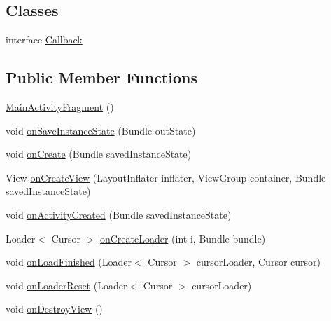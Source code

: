 \subsection*{Classes}
\begin{DoxyCompactItemize}
\item 
interface \hyperlink{interfaceorg_1_1buildmlearn_1_1dictation_1_1fragment_1_1MainActivityFragment_1_1Callback}{Callback}
\end{DoxyCompactItemize}
\subsection*{Public Member Functions}
\begin{DoxyCompactItemize}
\item 
\hyperlink{classorg_1_1buildmlearn_1_1dictation_1_1fragment_1_1MainActivityFragment_a63ceb64cf120683a0f4fa92cc9d1f709}{Main\+Activity\+Fragment} ()
\item 
void \hyperlink{classorg_1_1buildmlearn_1_1dictation_1_1fragment_1_1MainActivityFragment_af928359b96c8df2d535084087c664a16}{on\+Save\+Instance\+State} (Bundle out\+State)
\item 
void \hyperlink{classorg_1_1buildmlearn_1_1dictation_1_1fragment_1_1MainActivityFragment_ab5fcc0a30e26d51637458ee42dd31856}{on\+Create} (Bundle saved\+Instance\+State)
\item 
View \hyperlink{classorg_1_1buildmlearn_1_1dictation_1_1fragment_1_1MainActivityFragment_aaad4c9b624484fe217bf17a0690b1fbf}{on\+Create\+View} (Layout\+Inflater inflater, View\+Group container, Bundle saved\+Instance\+State)
\item 
void \hyperlink{classorg_1_1buildmlearn_1_1dictation_1_1fragment_1_1MainActivityFragment_ab0d7d7f231bda29e3f014ffb48165bcf}{on\+Activity\+Created} (Bundle saved\+Instance\+State)
\item 
Loader$<$ Cursor $>$ \hyperlink{classorg_1_1buildmlearn_1_1dictation_1_1fragment_1_1MainActivityFragment_a5601495a36de14b553f3b35230cd0850}{on\+Create\+Loader} (int i, Bundle bundle)
\item 
void \hyperlink{classorg_1_1buildmlearn_1_1dictation_1_1fragment_1_1MainActivityFragment_a649b6e347b7e71a7452ae2f91981fa81}{on\+Load\+Finished} (Loader$<$ Cursor $>$ cursor\+Loader, Cursor cursor)
\item 
void \hyperlink{classorg_1_1buildmlearn_1_1dictation_1_1fragment_1_1MainActivityFragment_a1e38cda6e1f613716c02bf4ca05ae38f}{on\+Loader\+Reset} (Loader$<$ Cursor $>$ cursor\+Loader)
\item 
void \hyperlink{classorg_1_1buildmlearn_1_1dictation_1_1fragment_1_1MainActivityFragment_af535657151a759cba221475fef366b05}{on\+Destroy\+View} ()
\end{DoxyCompactItemize}
